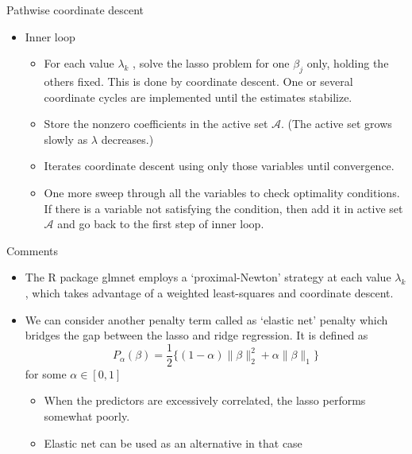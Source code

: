 \documentclass[11pt]{beamer}
\newcommand{\A}{\mathcal{A}}
\begin{document}
\begin{frame}{Pathwise coordinate descent}
    \begin{itemize}
        \item Inner loop
        \begin{itemize}
            \item For each value $\lambda_k$ , solve the lasso problem for one $\beta_j$ only, holding the others fixed. This is done by coordinate descent. One or several coordinate cycles are implemented until the estimates stabilize.
            \item Store the nonzero coefficients in the active set $\A$. (The active set grows slowly as $\lambda$ decreases.)
            \item Iterates coordinate descent using only those variables until convergence.
            \item One more sweep through all the variables to check optimality conditions. If there is a variable not satisfying the condition, then add it in active set $\A$ and go back to the first step of inner loop.
        \end{itemize}
    \end{itemize}
\end{frame}

\begin{frame}{Comments}
    \begin{itemize}
        \item The R package glmnet employs a `proximal-Newton' strategy at each value $\lambda_k$, which takes advantage of a weighted least-squares and coordinate descent.
        \item We can consider another penalty term called as `elastic net' penalty which bridges the gap between the lasso and ridge regression. It is defined as $$P_\alpha(\beta)=\frac 12 \{(1-\alpha)\|\beta\|_2^2 +\alpha \|\beta\|_1 \} $$ for some $\alpha\in [0,1]$
        \begin{itemize}
            \item When the predictors are excessively correlated, the lasso performs somewhat poorly. 
            \item Elastic net can be used as an alternative in that case
        \end{itemize}
    \end{itemize}
\end{frame}
\end{document}
